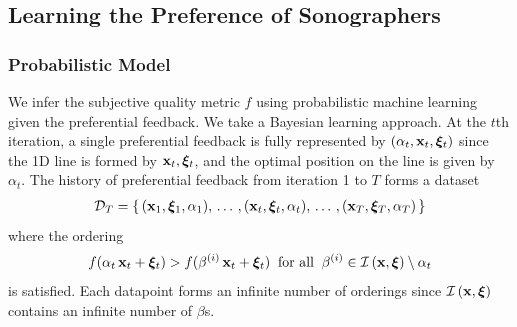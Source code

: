 \subsection{Learning the Preference of Sonographers}\label{section:gp}
\subsubsection{Probabilistic Model}
We infer the subjective quality metric \(f\) using probabilistic machine learning given the preferential feedback.
We take a Bayesian learning approach.
At the \(t\)th iteration, a single preferential feedback is fully represented by \((\alpha_t, \mathbf{x}_t, \bm{\xi}_t)\) since the 1D line is formed by \(\mathbf{x}_t, \bm{\xi}_t\), and the optimal position on the line is given by \(\alpha_t\).
The history of preferential feedback from iteration 1 to \(T\) forms a dataset
%
\begin{align}
  \mathcal{D}_T = \{\,(\mathbf{x}_1, \bm{\xi}_1, \alpha_1),\, \ldots\,, (\mathbf{x}_t, \bm{\xi}_t, \alpha_t),\,\ldots\,, (\mathbf{x}_T, \bm{\xi}_T, \alpha_T) \,\}
\end{align}
%
where the ordering
\begin{align}
f(\alpha_t\,\mathbf{x}_t + \bm{\xi}_t ) > f(\beta^{(i)}\,\mathbf{x}_t + \bm{\xi}_t) \;\;\text{for all}\;\; \beta^{(i)} \in \mathcal{I}\left(\mathbf{x}, \bm{\xi}\right) \setminus \alpha_t
\end{align}
is satisfied.
Each datapoint forms an infinite number of orderings since \(\mathcal{I}\left(\mathbf{x}, \bm{\xi}\right)\) contains an infinite number of \(\beta\)s.

